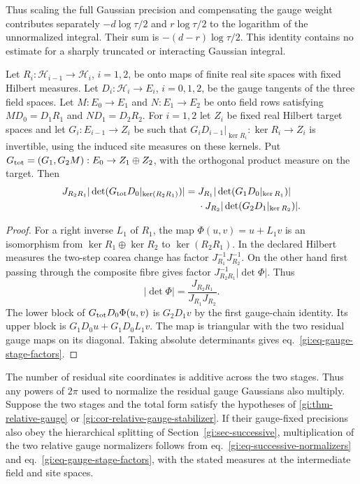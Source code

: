 \documentclass[11pt,letterpaper,reqno]{amsart}
\makeatletter
\numberwithin{equation}{section}
\renewcommand{\eqref}[1]{\textup{eq.~\ref{#1}}}
\theoremstyle{definition}
\newcommand{\ms@minorstart}{%
  \pushQED{\qed}\renewcommand{\qedsymbol}{$\blacksquare$}}
\newenvironment{proposition}[1][]{\ms@minorstart\ms@proposition[#1]}
  {\popQED\endms@proposition}
\theoremstyle{remark}
\makeatother
\begin{document}
Thus scaling the full Gaussian precision and compensating
the gauge weight contributes separately
$-d\log\tau/2$ and $r\log\tau/2$ to the logarithm of
the unnormalized integral. Their sum is
$-(d-r)\log\tau/2$. This identity contains no estimate
for a sharply truncated or interacting Gaussian integral.

\begin{proposition}[Successive residual gauge factors]
\label{gi:prop-gauge-stage-factors}
Let \(R_i:\mathcal H_{i-1}\to\mathcal H_i\), \(i=1,2\),
be onto maps of finite real site spaces with fixed Hilbert
measures. Let \(D_i:\mathcal H_i\to E_i\), \(i=0,1,2\),
be the gauge tangents of the three field spaces. Let
\(M:E_0\to E_1\) and \(N:E_1\to E_2\) be onto field rows
satisfying \(MD_0=D_1R_1\) and \(ND_1=D_2R_2\).
For \(i=1,2\) let \(Z_i\) be fixed real Hilbert target spaces
and let \(G_i:E_{i-1}\to Z_i\) be such that
\(G_iD_{i-1}|_{\ker R_i}:\ker R_i\to Z_i\) is invertible,
using the induced site measures on these kernels. Put
\(G_{\rm tot}=(G_1,G_2M):E_0\to Z_1\oplus Z_2\), with
the orthogonal product measure on the target. Then
\begin{equation}\label{gi:eq-gauge-stage-factors}
\begin{aligned}
 J_{R_2R_1}|\det(G_{\rm tot}D_0|_{\ker(R_2R_1)})|
  ={}& J_{R_1}|\det(G_1D_0|_{\ker R_1})|\\
     &{}\cdot J_{R_2}|\det(G_2D_1|_{\ker R_2})| .
\end{aligned}
\end{equation}
\end{proposition}

\begin{proof}
For a right inverse \(L_1\) of \(R_1\), the map
\(\Phi(u,v)=u+L_1v\) is an isomorphism
from \(\ker R_1\oplus\ker R_2\) to \(\ker(R_2R_1)\).
In the declared Hilbert measures the two-step coarea change
has factor \(J_{R_1}^{-1}J_{R_2}^{-1}\).
On the other hand first passing through the composite
fibre gives factor \(J_{R_2R_1}^{-1}|\det\Phi|\).
Thus
\[
                  |\det\Phi|=\frac{J_{R_2R_1}}{J_{R_1}J_{R_2}} .
\]
The lower block of \(G_{\rm tot}D_0\Phi(u,v)\) is
\(G_2D_1v\) by the first gauge-chain identity. Its upper
block is \(G_1D_0u+G_1D_0L_1v\). The map is triangular
with the two residual gauge maps on its diagonal. Taking
absolute determinants gives \eqref{gi:eq-gauge-stage-factors}.
\end{proof}

The number of residual site coordinates is additive across the
two stages. Thus any powers of \(2\pi\) used to normalize the
residual gauge Gaussians also multiply. Suppose the two
stages and the total form satisfy the hypotheses of
\cref{gi:thm-relative-gauge} or
\cref{gi:cor-relative-gauge-stabilizer}. If their gauge-fixed
precisions also obey the hierarchical splitting of
Section~\ref{gi:sec-successive}, multiplication of the two
relative gauge normalizers follows
from \eqref{gi:eq-successive-normalizers} and
\eqref{gi:eq-gauge-stage-factors}, with the stated measures
at the intermediate field and site spaces.
\end{document}
